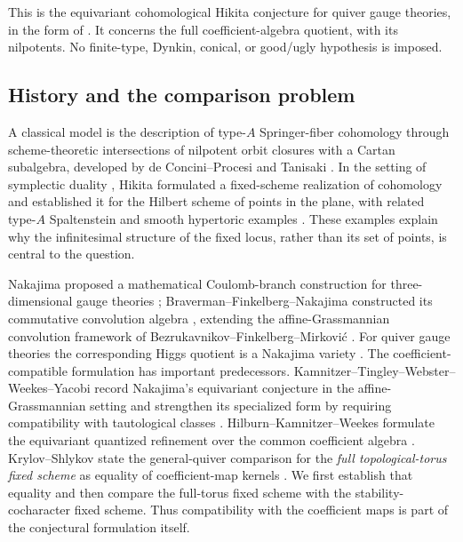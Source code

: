 This is the equivariant cohomological Hikita conjecture for quiver gauge
theories, in the form of \cite[Conjecture~2.1, Equation~(2.3)]{DK25}.
It concerns the full coefficient-algebra quotient, with its nilpotents.
No finite-type, Dynkin, conical, or good/ugly hypothesis is imposed.

\subsection{History and the comparison problem}

A classical model is the description of type-$A$ Springer-fiber
cohomology through scheme-theoretic intersections of nilpotent orbit
closures with a Cartan subalgebra, developed by de Concini--Procesi and
Tanisaki \cite{DeConciniProcesi81,Tanisaki82}.  In the setting of
symplectic duality \cite{BLPW16}, Hikita formulated a fixed-scheme
realization of cohomology and established it for the Hilbert scheme of
points in the plane, with related type-$A$ Spaltenstein and smooth
hypertoric examples \cite{Hikita17}.  These examples explain why the
infinitesimal structure of the fixed locus, rather than its set of
points, is central to the question.

Nakajima proposed a mathematical Coulomb-branch construction for
three-dimensional gauge theories \cite{Nakajima16};
Braverman--Finkelberg--Nakajima constructed its commutative convolution
algebra \cite{BFN18,BFN19}, extending the affine-Grassmannian convolution
framework of Bezrukavnikov--Finkelberg--Mirkovi\'c \cite{BFM05}.
For quiver gauge theories the corresponding
Higgs quotient is a Nakajima variety \cite{Nakajima94}.
The coefficient-compatible formulation has important predecessors.
Kamnitzer--Tingley--Webster--Weekes--Yacobi record Nakajima's equivariant
conjecture in the affine-Grassmannian setting and strengthen its
specialized form by requiring compatibility with tautological classes
\cite[Conjectures~8.9--8.10]{KTWWY19}.
Hilburn--Kamnitzer--Weekes formulate the equivariant quantized refinement
over the common coefficient algebra
\cite[Section~5.7, Conjecture~5.26]{HKW23}.
Krylov--Shlykov state the general-quiver comparison for the
\emph{full topological-torus fixed scheme} as equality of coefficient-map
kernels \cite[Section~8.1, Conjecture~8.1]{KrylovShlykov25}.
We first establish that equality and then compare the full-torus fixed
scheme with the stability-cocharacter fixed scheme.
Thus compatibility with the coefficient maps is part of the conjectural
formulation itself.

